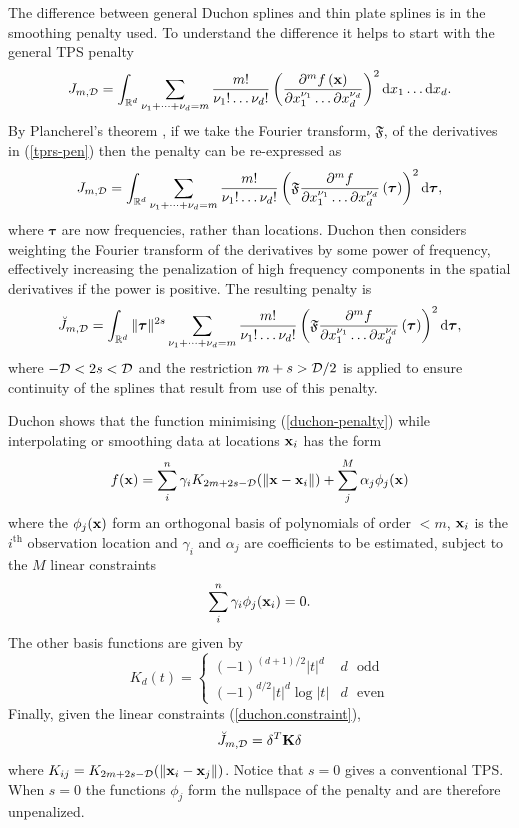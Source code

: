 \documentclass[smallextended]{svjour3}       %
\newcommand{\beq}{\begin{equation}}
\newcommand{\eeq}{\end{equation}}
\newcommand{\ts}{^T}
\begin{document}
The difference between general Duchon splines and thin plate splines is in the smoothing penalty used. To understand the difference it helps to start with the general TPS penalty
\begin{equation}
J_{m,{\cal D}} = \int_{\mathbb{R}^d} \sum_{\nu_1 + \dots + \nu_d=m} \frac{m!}{\nu_1! \dots \nu_d!} \left( \frac{\partial^m f \left (\mathbf{x} \right )}{\partial x_1^{\nu_1} \ldots  \partial x_d^{\nu_d}} \right)^2 \text{d} x_1 \ldots  \text{d} x_d.
\label{tprs-pen}
\end{equation}
By Plancherel's theorem \citep[e.g.][p. 180]{vretblad2003fourier}, if we take the Fourier transform, $\mathfrak{F}$, of the derivatives in (\ref{tprs-pen}) then the penalty can be re-expressed as
\begin{equation}
J_{m,{\cal D}} =  \int_{\mathbb{R}^d} \sum_{\nu_1 + \dots + \nu_d=m} \frac{m!}{\nu_1! \dots \nu_d!} \left ( \mathfrak{F} \frac{\partial^m f}{\partial x_1^{\nu_1} \ldots  \partial x_d^{\nu_d}} \left (  \boldsymbol{\tau}\right ) \right )^2 \text{d} \boldsymbol{\tau},
\label{tprs-pen-ft}
\end{equation}
where $\bm \tau$ are now frequencies, rather than locations. Duchon then considers weighting the Fourier transform of the derivatives by some power of frequency, effectively increasing the penalization of high frequency components in the spatial derivatives if the power is positive. The resulting penalty is 
\begin{equation}
\breve{J}_{m,{\cal D}} = \int_{\mathbb{R}^d} \| \boldsymbol{\tau} \|^{2s} \sum_{\nu_1 + \dots + \nu_d=m} \frac{m!}{\nu_1! \dots \nu_d!}\left ( \mathfrak{F} \frac{\partial^m f}{\partial x_1^{\nu_1} \ldots  \partial x_d^{\nu_d}} \left (\boldsymbol{\tau} \right ) \right )^2 \text{d} \boldsymbol{\tau},
\label{duchon-penalty}
\end{equation}
where $-{\cal D} < 2s < {\cal D}$ and the restriction $m + s > {\cal D}/2$ is applied to ensure continuity of the splines that result from use of this penalty. 

Duchon shows that the function minimising (\ref{duchon-penalty}) while interpolating or smoothing data at locations ${\bf x}_i$ has the form 
$$
f({\bf x}) = \sum_i^n \gamma_i K_{2m+2s-{\cal D}}(\|{\bf x}-{\bf x}_i\|) + \sum_j^M \alpha_j \phi_j({\bf x})
$$
where the $\phi_j({\bf x})$ form an orthogonal basis of polynomials of order $<m$, ${\bf x}_i$ is the $i^\text{th}$ observation location and $\gamma_i$ and $\alpha_j$ are coefficients to be estimated, subject to the $M$ linear constraints
\beq
\sum_i^n \gamma_i \phi_j({\bf x}_i)=0.
\label{duchon.constraint}
\eeq
The other basis functions are given by
$$
K_d(t) = \left \{ \begin{array}{ll}
(-1)^{(d+1)/2}|t|^d & d \text{~~odd}\\
(-1)^{d/2}|t|^d\log |t| & d \text{~~even}
\end{array} \right .
$$
Finally, given the linear constraints (\ref{duchon.constraint}),
$$
\breve{J}_{m,{\cal D}} = {\bf \delta} \ts {\bf K} {\bf \delta}
$$
where $K_{ij} = K_{2m+2s-{\cal D}}(\|{\bf x}_i-{\bf x}_j\|)$. Notice that $s=0$ gives a conventional TPS. When $s=0$ the functions $\phi_j$ form the nullspace of the penalty and are therefore unpenalized.
\end{document}
